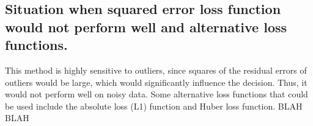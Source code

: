     \subsection{Situation when squared error loss function would not perform well and alternative loss functions.}
    This method is highly sensitive to outliers, since squares of the residual errors of outliers would be large, which would significantly influence the decision. Thus, it would not perform well on noisy data. Some alternative loss functions that could be used include the absolute loss (L1) function and Huber loss function.  BLAH BLAH
